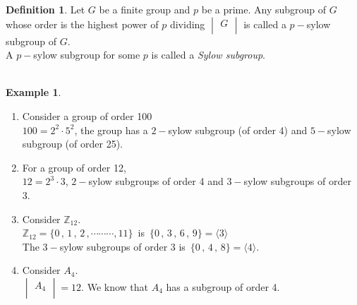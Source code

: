 \documentclass[11pt,a4paper]{article}
\theoremstyle{definition}
\newtheorem{defn}[thm]{Definition}
\newtheorem{exa}[thm]{Example}
\begin{document}
\begin{defn}
Let $G$ be a finite group and $p$ be a prime. Any subgroup of $G$ whose order is the highest power of $p$ dividing $\begin{vmatrix}
G\\
\end{vmatrix}$ is called a $p-$sylow subgroup of $G$.\\


A $p-$sylow subgroup for some $p$ is called a \textit{Sylow subgroup}.\\\\
\end{defn}





\begin{exa}
\begin{enumerate}
\item Consider a group of order 100\\
$100 = 2^2\cdot 5^2$, the group has a $2-$sylow subgroup (of order 4) and $5-$sylow subgroup (of order 25).

\item For a group of order 12,\\
$12 = 2^3\cdot 3$, $2-$sylow subgroups of order 4 and $3-$sylow subgroups of order 3.

\item Consider $\mathbb{Z}_{12}.$\\
$\mathbb{Z}_{12} = \{0\, , \, 1\, , \, 2\,, \cdots\cdots\cdots,11\}\,$ is $\, \{0\, , \, 3\, , \, 6\, , \,9\} = \langle 3\rangle$\\
The $3-$sylow subgroups of order 3 is $\, \{0\,,\, 4\, , \, 8\} = \langle 4\rangle$.

\item Consider $A_4$.\\
$\begin{vmatrix}
A_4\\
\end{vmatrix} = 12$. We know that $A_4$ has a subgroup of order 4.\\\\\\
\end{enumerate}
\end{exa}
\end{document}
